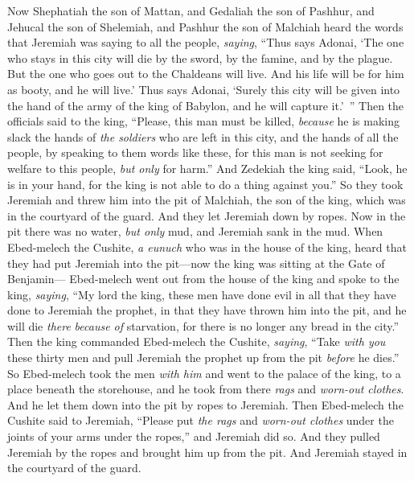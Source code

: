 \begin{biblechapter} %
 Now Shephatiah the son of Mattan, and Gedaliah the son of Pashhur, and Jehucal the son of Shelemiah, and Pashhur the son of Malchiah heard the words that Jeremiah was saying to all the people, \textit{saying},
\verse “Thus says Adonai, ‘The one who stays in this city will die by the sword, by the famine, and by the plague. But the one who goes out to the Chaldeans will live. And his life will be for him as booty, and he will live.’
\verse Thus says Adonai, ‘Surely this city will be given into the hand of the army of the king of Babylon, and he will capture it.’ ”
\verse Then the officials said to the king, “Please, this man must be killed, \textit{because} he is making slack the hands of \textit{the soldiers} who are left in this city, and the hands of all the people, by speaking to them words like these, for this man is not seeking for welfare to this people, \textit{but only} for harm.”
\verse And Zedekiah the king said, “Look, he is in your hand, for the king is not able to do a thing against you.”
\verse So they took Jeremiah and threw him into the pit of Malchiah, the son of the king, which was in the courtyard of the guard. And they let Jeremiah down by ropes. Now in the pit there was no water, \textit{but only} mud, and Jeremiah sank in the mud.
\verse When Ebed-melech the Cushite, \textit{a eunuch} who was in the house of the king, heard that they had put Jeremiah into the pit—now the king was sitting at the Gate of Benjamin—
\verse Ebed-melech went out from the house of the king and spoke to the king, \textit{saying},
\verse “My lord the king, these men have done evil in all that they have done to Jeremiah the prophet, in that they have thrown him into the pit, and he will die \textit{there} \textit{because of} starvation, for there is no longer any bread in the city.”
\verse Then the king commanded Ebed-melech the Cushite, \textit{saying}, “Take \textit{with you} these thirty men and pull Jeremiah the prophet up from the pit \textit{before} he dies.”
\verse So Ebed-melech took the men \textit{with him} and went to the palace of the king, to a place beneath the storehouse, and he took from there \textit{rags} and \textit{worn-out clothes}. And he let them down into the pit by ropes to Jeremiah.
\verse Then Ebed-melech the Cushite said to Jeremiah, “Please put \textit{the rags} and \textit{worn-out clothes} under the joints of your arms under the ropes,” and Jeremiah did so.
\verse And they pulled Jeremiah by the ropes and brought him up from the pit. And Jeremiah stayed in the courtyard of the guard.

\end{biblechapter}
